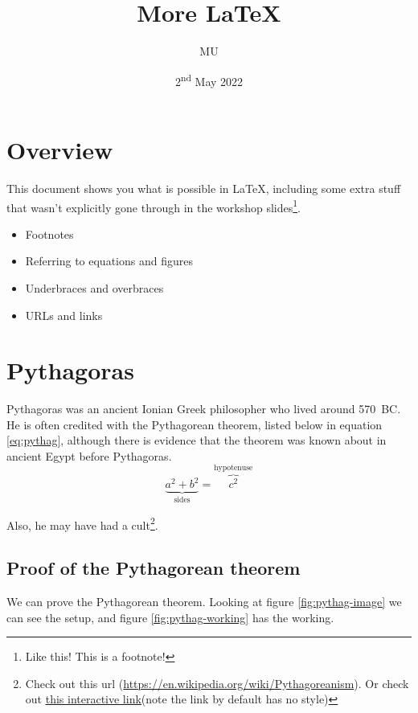 \documentclass{article}
\title{More \LaTeX{}}
\author{MU}
\date{2\textsuperscript{nd} May 2022}
\begin{document}
    \maketitle

    \section{Overview}
    This document shows you what is possible in \LaTeX{}, including some extra stuff that wasn't explicitly gone through in the workshop slides\footnote{Like this! This is a footnote!}.

    \begin{itemize}
        \item Footnotes
        \item Referring to equations and figures
        \item Underbraces and overbraces
        \item URLs and links
    \end{itemize}

    \section{Pythagoras}
    Pythagoras was an ancient Ionian Greek philosopher who lived around 570~BC. %
    He is often credited with the Pythagorean theorem, listed below in equation \eqref{eq:pythag}, although there is evidence that the theorem was known about in ancient Egypt before Pythagoras.
    \begin{equation}
        \underbrace{a^2 + b^2}_\text{sides} = \overbrace{c^2}^\text{hypotenuse}
        \label{eq:pythag}
    \end{equation}

    Also, he may have had a cult\footnote{Check out this url (\url{https://en.wikipedia.org/wiki/Pythagoreanism}). Or check out \href{https://en.wikipedia.org/wiki/Pythagoreanism}{\color{blue}\underline{this interactive link}}(note the link by default has no style)}.


    \subsection{Proof of the Pythagorean theorem}
    We can prove the Pythagorean theorem. Looking at figure \ref{fig:pythag-image} we can see the setup, and figure \ref{fig:pythag-working} has the working.
    
\end{document}
